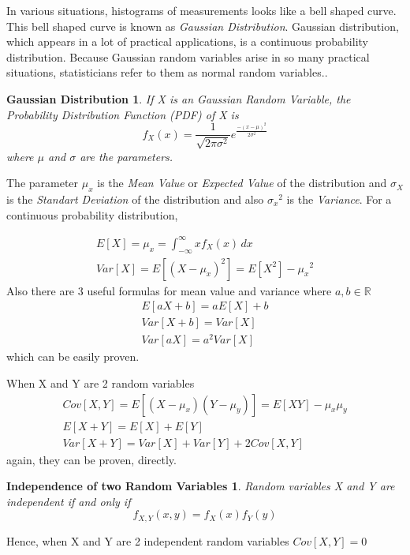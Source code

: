 \documentclass[12pt,fleqn]{report}
\begin{document}
In various situations, histograms of measurements looks like a bell shaped curve. This bell shaped curve is known as \textit{Gaussian Distribution}. Gaussian distribution, which appears in a lot of practical applications, is a continuous probability distribution. Because Gaussian random variables arise in so many practical situations, statisticians refer to them as normal random variables.\cite[p. 248]{wiley}.  
\newtheorem*{gauss*}{Gaussian Distribution}
\begin{gauss*}
If X is an Gaussian Random Variable, the Probability Distribution Function (PDF) of X is
$$f_X(x) = \frac{1}{\sqrt{2\pi\sigma^2}}e^\frac{-(x-\mu)^2}{2\sigma^2} $$
where $\mu$  and $\sigma$  are the parameters.
\end{gauss*}
  
The parameter $\mu_x$ is the \textit{Mean Value} or \textit{Expected Value} of the distribution and $\sigma_X$ is the \textit{Standart Deviation} of the distribution and also ${\sigma_x}^2$ is the \textit{Variance}.
For a continuous probability distribution,

\begin{gather}
E[X] = \mu_x = \int_{-\infty}^\infty xf_X(x) \,dx  \\
Var[X] = E[(X-\mu_x)^2] = E[X^2] - {\mu_x}^2
\end{gather}
Also there are 3 useful formulas for mean value and variance where $a,b \in\mathbb{R}$ 
\begin{gather}
E[aX+b] = aE[X] + b  \\
Var[X+b] = Var[X]  \\
Var[aX] = a^2Var[X] 
\end{gather}
which can be easily proven.

When X and Y are 2 random variables
\begin{gather}
Cov[X,Y] = E[(X-\mu_x)(Y-\mu_y)] = E[XY] -\mu_x \mu_y \\
E[X + Y] = E[X] + E[Y] \\
Var[X + Y] = Var[X] + Var[Y] + 2Cov[X,Y]
\end{gather}
again, they can be proven, directly.

\newtheorem*{independence}{Independence of two Random Variables}
\begin{independence}
Random variables X and Y are independent if and only if 
$$ f_{X,Y}(x,y) = f_X(x)f_Y(y)$$
\end{independence}
Hence, when X and Y are 2 independent random variables $Cov[X,Y]=0$
\end{document}
